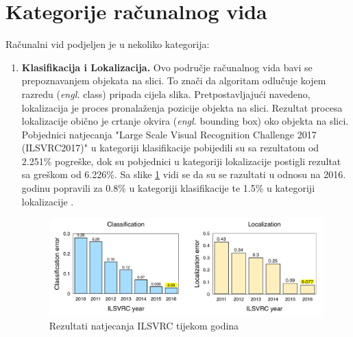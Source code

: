 \section{Kategorije računalnog vida}
Računalni vid podjeljen je u nekoliko kategorija:
\begin{enumerate}
\item \textbf{Klasifikacija i Lokalizacija.} Ovo područje računalnog vida bavi se prepoznavanjem objekata na slici. To znači da algoritam odlučuje kojem razredu (\textit{engl.} class) pripada cijela slika. Pretpostavljajući navedeno, lokalizacija je proces pronalaženja pozicije objekta na slici. Rezultat procesa lokalizacije obično je crtanje okvira (\textit{engl.} bounding box) oko objekta na slici. Pobjednici natjecanja "Large Scale Visual Recognition Challenge 2017 (ILSVRC2017)" u kategoriji klasifikacije pobijedili su sa rezultatom od 2.251\% pogreške, dok su pobjednici u kategoriji lokalizacije postigli rezultat sa greškom od 6.226\%. Sa slike \ref{img:ILSVRC} vidi se da su se razultati u odnosu na 2016. godinu popravili za 0.8\% u kategoriji klasifikacije te 1.5\% u kategoriji lokalizacije .
\begin{figure}[htb]
\centering
\includegraphics[width=\linewidth]{img/ILSVRC.png}
\caption{Rezultati natjecanja ILSVRC tijekom godina \citep{ILSVRC}}
\label{img:ILSVRC}
\end{figure}


\end{enumerate}
